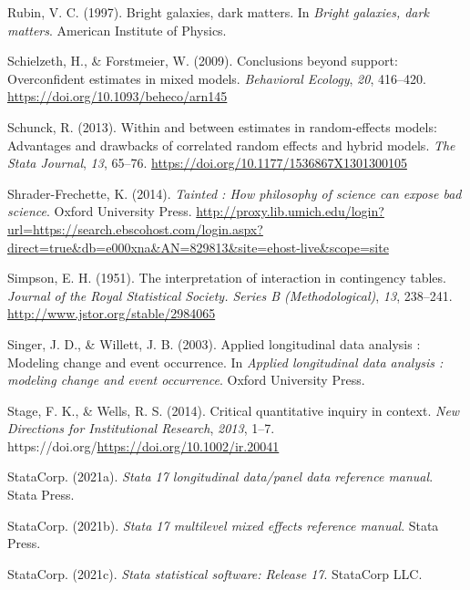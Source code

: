 \documentclass[
  letterpaper,
  DIV=11,
  numbers=noendperiod]{scrreprt}
\newlength{\cslhangindent}
\newlength{\cslentryspacingunit} %
\newenvironment{CSLReferences}[2] %
 {%
  \setlength{\parindent}{0pt}
  \ifodd #1
  \let\oldpar\par
  \def\par{\hangindent=\cslhangindent\oldpar}
  \fi
  \setlength{\parskip}{#2\cslentryspacingunit}
 }%
 {}
\begin{document}
\begin{CSLReferences}{1}{0}
\leavevmode{}%
Rubin, V. C. (1997). Bright galaxies, dark matters. In \emph{Bright
galaxies, dark matters}. American Institute of Physics.

\leavevmode{}%
Schielzeth, H., \& Forstmeier, W. (2009). Conclusions beyond support:
Overconfident estimates in mixed models. \emph{Behavioral Ecology},
\emph{20}, 416--420. \url{https://doi.org/10.1093/beheco/arn145}

\leavevmode{}%
Schunck, R. (2013). Within and between estimates in random-effects
models: Advantages and drawbacks of correlated random effects and hybrid
models. \emph{The Stata Journal}, \emph{13}, 65--76.
\url{https://doi.org/10.1177/1536867X1301300105}

\leavevmode{}%
Shrader-Frechette, K. (2014). \emph{Tainted : How philosophy of science
can expose bad science}. Oxford University Press.
\url{http://proxy.lib.umich.edu/login?url=https://search.ebscohost.com/login.aspx?direct=true\&db=e000xna\&AN=829813\&site=ehost-live\&scope=site}

\leavevmode{}%
Simpson, E. H. (1951). The interpretation of interaction in contingency
tables. \emph{Journal of the Royal Statistical Society. Series B
(Methodological)}, \emph{13}, 238--241.
\url{http://www.jstor.org/stable/2984065}

\leavevmode{}%
Singer, J. D., \& Willett, J. B. (2003). Applied longitudinal data
analysis : Modeling change and event occurrence. In \emph{Applied
longitudinal data analysis : modeling change and event occurrence}.
Oxford University Press.

\leavevmode{}%
Stage, F. K., \& Wells, R. S. (2014). Critical quantitative inquiry in
context. \emph{New Directions for Institutional Research}, \emph{2013},
1--7. https://doi.org/\url{https://doi.org/10.1002/ir.20041}

\leavevmode{}%
StataCorp. (2021a). \emph{Stata 17 longitudinal data/panel data
reference manual}. Stata Press.

\leavevmode{}%
StataCorp. (2021b). \emph{Stata 17 multilevel mixed effects reference
manual}. Stata Press.

\leavevmode{}%
StataCorp. (2021c). \emph{Stata statistical software: Release 17}.
StataCorp LLC.


\end{CSLReferences}
\end{document}
